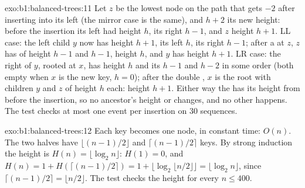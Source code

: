 \begin{solution}{exo:b1:balanced-trees:11}
Let $z$ be the lowest node on the path that gets  $-2$ after inserting into its left  (the mirror
case is the same), and $h + 2$ its new height: before the insertion its left  had height $h$, its right 
$h - 1$, and $z$ height $h + 1$. LL case: the left child $y$ now has height $h + 1$, its left  $h$, its right $h -
1$; after a  at $z$, $z$ has  of height $h - 1$ and $h - 1$, height $h$, and $y$ has height $h + 1$.
LR case: the right  of $y$, rooted at $x$, has height $h$ and its  $h - 1$ and $h - 2$ in some order (both empty when $x$ is the new key, $h = 0$);
after the double , $x$ is the root with children $y$ and $z$ of height $h$ each: height $h + 1$. Either way the
 has its height from before the insertion, so no ancestor's height or  changes, and no other
 happens. The test checks at most one  event per insertion on 30 sequences.
\end{solution}

\begin{solution}{exo:b1:balanced-trees:12}
Each key becomes one node, in constant time: $O(n)$. The two halves have $\lfloor (n - 1)/2 \rfloor$ and $\lceil (n -
1)/2 \rceil$ keys. By strong induction the height is $H(n) = \lfloor \log_2 n \rfloor$: $H(1) = 0$, and $H(n) = 1 +
H(\lceil (n-1)/2 \rceil) = 1 + \lfloor \log_2 \lfloor n/2 \rfloor \rfloor = \lfloor \log_2 n \rfloor$, since $\lceil
(n - 1)/2 \rceil = \lfloor n/2 \rfloor$. The test checks the height for every $n \leq 400$.
\end{solution}

